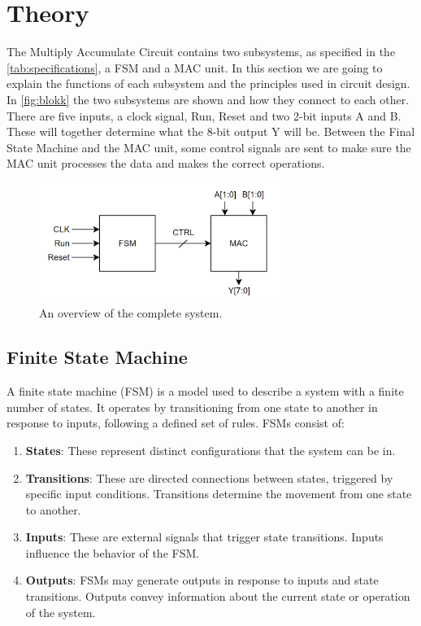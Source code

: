 \newpage
\section{Theory}
\label{sec:theory}

The Multiply Accumulate Circuit contains two subsystems, as specified in the \autoref{tab:specifications}, a FSM and a MAC unit. In this section we are going to explain the functions of each subsystem and the principles used in circuit design. In \autoref{fig:blokk} the two subsystems are shown and how they connect to each other. There are five inputs, a clock signal, Run, Reset and two 2-bit inputs A and B. These will together determine what the 8-bit output Y will be. Between the Final State Machine and the MAC unit, some control signals are sent to make sure the MAC unit processes the data and makes the correct operations. 

\begin{figure}[H]
    \centering
    \includegraphics[width=0.7\textwidth]{Figures/Blokk.png}
    \caption{An overview of the complete system.}
    \label{fig:blokk}
\end{figure}

\subsection{Finite State Machine}
\label{subsec:fsm_theory}

A finite state machine (FSM) is a model used to describe a system with a finite number of states. It operates by transitioning from one state to another in response to inputs, following a defined set of rules. FSMs consist of:

\begin{enumerate}
    \item \textbf{States}: These represent distinct configurations that the system can be in.
    
    \item \textbf{Transitions}: These are directed connections between states, triggered by specific input conditions. Transitions determine the movement from one state to another.
    
    \item \textbf{Inputs}: These are external signals that trigger state transitions. Inputs influence the behavior of the FSM.
    
    \item \textbf{Outputs}: FSMs may generate outputs in response to inputs and state transitions. Outputs convey information about the current state or operation of the system.
\end{enumerate}

